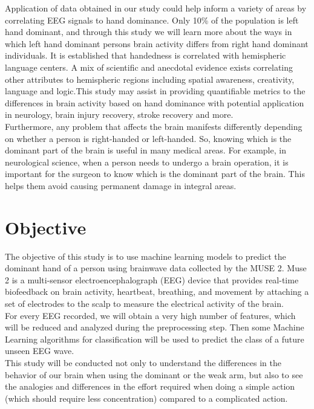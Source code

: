 \documentclass[a4paper]{article}
\begin{document}
Application of data obtained in our study could help inform a variety of areas by correlating EEG signals to hand dominance. Only 10\% of the population is left hand dominant, and through this study we will learn more about the ways in which left hand dominant persons brain activity differs from right hand dominant individuals. It is established that handedness is correlated with hemispheric language centers. A mix of scientific and anecdotal evidence exists correlating other attributes to hemispheric regions including spatial awareness, creativity, language and logic.This study may assist in providing quantifiable metrics to the differences in brain activity based on hand dominance with potential application in neurology, brain injury recovery, stroke recovery and more.\\

Furthermore, any problem that affects the brain manifests differently depending on whether a person is right-handed or left-handed. So, knowing which is the dominant part of the brain is useful in many medical areas. For example, in neurological science, when a person needs to undergo a brain operation, it is important for the surgeon to know which is the dominant part of the brain. This helps them avoid causing permanent damage in integral areas.\\



\section{Objective} 

The objective of this study is to use machine learning models to predict the dominant hand of a person using brainwave data collected by the MUSE 2.  Muse 2 is a multi-sensor electroencephalograph (EEG) device that provides real-time biofeedback on brain activity, heartbeat, breathing, and movement by attaching a set of electrodes to the scalp to measure the electrical activity of the brain.\\

For every EEG recorded, we will obtain a very high number of features, which will be reduced and analyzed during the preprocessing step. Then some Machine Learning algorithms for classification will be used to predict the class of a future unseen EEG wave.\\

This study will be conducted not only to understand the differences in the behavior of our brain when using the dominant or the weak arm, but also to see the analogies and differences in the effort required when doing a simple action (which should require less concentration) compared to a complicated action.\\
\end{document}
